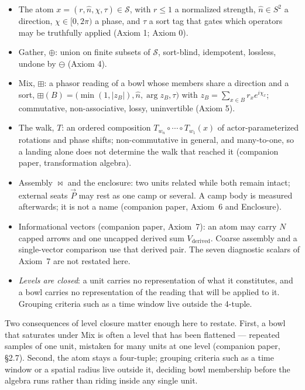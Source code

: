 \documentclass[12pt, a4paper]{article}
\begin{document}
\begin{itemize}
\item The atom $x=(r,\hat n,\chi,\tau)\in\mathcal{S}$, with $r\le 1$ a
      normalized strength, $\hat n\in S^2$ a direction, $\chi\in[0,2\pi)$
      a phase, and $\tau$ a sort tag that gates which operators may be
      truthfully applied (Axiom 1; Axiom 0).
\item Gather, $\oplus$: union on finite subsets of $\mathcal{S}$,
      sort-blind, idempotent, lossless, undone by $\ominus$ (Axiom 4).
\item Mix, $\boxplus$: a phasor reading of a bowl whose members share a
      direction and a sort,
      $\boxplus(B)=\bigl(\min(1,|z_B|),\hat n,\arg z_B,\tau\bigr)$
      with $z_B=\sum_{x\in B} r_x e^{i\chi_x}$; commutative,
      non-associative, lossy, uninvertible (Axiom 5).
\item The walk, $T$: an ordered composition
      $T_{w_n}\circ\cdots\circ T_{w_1}(x)$ of actor-parameterized
      rotations and phase shifts; non-commutative in general, and
      many-to-one, so a landing alone does not determine the walk that
      reached it (companion paper, transformation algebra).
\item Assembly $\bowtie$ and the enclosure: two units related while
      both remain intact; external seats $\vec P$ may rest as one
      camp or several. A camp body is measured afterwards; it is not
      a name (companion paper, Axiom~6 and Enclosure).
\item Informational vectors (companion paper, Axiom~7): an atom may
      carry $N$ capped arrows and one uncapped derived sum
      $V_{\mathrm{derived}}$. Coarse assembly and a single-vector
      comparison use that derived pair. The seven diagnostic
      scalars of Axiom~7 are not restated here.
\item \emph{Levels are closed}: a unit carries no representation of
      what it constitutes, and a bowl carries no representation of the
      reading that will be applied to it. Grouping criteria such as a
      time window live outside the 4-tuple.
\end{itemize}

Two consequences of level closure matter enough here to restate. First,
a bowl that saturates under Mix is often a level that has been
flattened --- repeated samples of one unit, mistaken for many units at
one level (companion paper, \S2.7). Second, the atom stays a
four-tuple; grouping criteria such as a time window or a spatial
radius live outside it, deciding bowl membership before the algebra
runs rather than riding inside any single unit.
\end{document}
